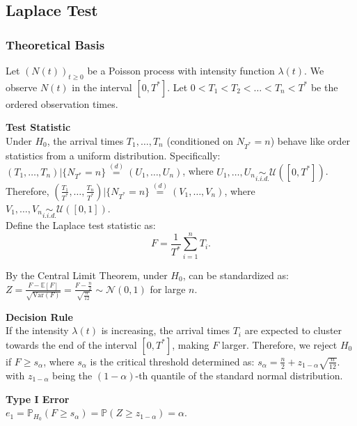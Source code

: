 \documentclass{journalstyle}
\begin{document}
\subsection{Laplace Test}

\subsubsection{Theoretical Basis}

Let $(N(t))_{t \geq 0}$ be a Poisson process with intensity function $\lambda(t)$.
We observe $N(t)$ in the interval $[0, T^*]$.
Let $0 < T_1 < T_2 < \ldots < T_n < T^*$ be the ordered observation times.

\noindent\textbf{Test Statistic} \\
Under $H_0$, the arrival times $T_1, \ldots, T_n$ (conditioned on $N_{T^*} = n$) behave like order statistics from a uniform distribution.
Specifically: \\
$(T_1, \ldots, T_n) | \{N_{T^*} = n\} \overset{(d)}{=} (U_1, \ldots, U_n)$, where $U_1, \ldots, U_n \underset{i.i.d.}{\sim} \mathcal{U}([0, T^*])$. \\
Therefore, $(\frac{T_1}{T^*}, \ldots, \frac{T_n}{T^*}) | \{N_{T^*} = n\} \overset{(d)}{=} (V_1, \ldots, V_n)$, where $V_1, \ldots, V_n \underset{i.i.d.}{\sim} \mathcal{U}([0, 1])$. \\
Define the Laplace test statistic as: 
\begin{equation}
    F = \frac{1}{T^*} \sum_{i=1}^n T_i.
    \label{eq:laplace_test_statistic}
\end{equation}

By the Central Limit Theorem, under $H_0$,  can be standardized as: 
$Z = \frac{F - \mathbb{E}[F]}{\sqrt{\text{Var}(F)}} = \frac{F - \frac{n}{2}}{\sqrt{\frac{n}{12}}} \sim \mathcal{N}(0, 1)$
for large $n$.

\noindent\textbf{Decision Rule} \\
If the intensity $\lambda(t)$ is increasing, the arrival times $T_i$ are expected to cluster towards the end of the interval $[0, T^*]$, making $F$ larger.
Therefore, we reject $H_0$ if $F \geq s_{\alpha}$, where $s_{\alpha}$ is the critical threshold determined as: $s_{\alpha} = \frac{n}{2} + z_{1 - \alpha} \sqrt{\frac{n}{12}}$. \\
with $z_{1 - \alpha}$ being the $(1 - \alpha)$-th quantile of the standard normal distribution.

\noindent\textbf{Type I Error} \\
$e_1 = \mathbb{P}_{H_0}(F \geq s_{\alpha}) = \mathbb{P}(Z \geq z_{1 - \alpha}) = \alpha$.
\end{document}
